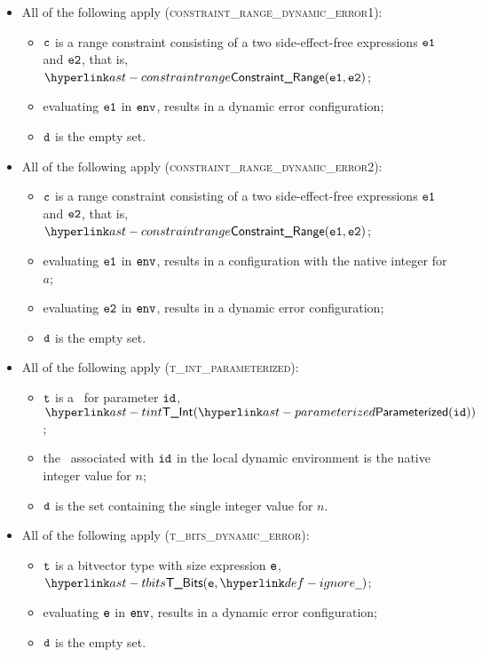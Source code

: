 \begin{itemize}
  \item All of the following apply (\textsc{constraint\_range\_dynamic\_error1}):
  \begin{itemize}
    \item $\texttt{c}$ is a range constraint consisting of a two side-effect-free expressions $\texttt{e1}$ and $\texttt{e2}$, that is, $\ConstraintRange(\veone, \vetwo)$;
    \item evaluating $\texttt{e1}$ in $\texttt{env}$, results in a dynamic error configuration;
    \item $\texttt{d}$ is the empty set.
  \end{itemize}

  \item All of the following apply (\textsc{constraint\_range\_dynamic\_error2}):
  \begin{itemize}
    \item $\texttt{c}$ is a range constraint consisting of a two side-effect-free expressions $\texttt{e1}$ and $\texttt{e2}$, that is, $\ConstraintRange(\veone, \vetwo)$;
    \item evaluating $\texttt{e1}$ in $\texttt{env}$, results in a configuration with the native integer for $a$;
    \item evaluating $\texttt{e2}$ in $\texttt{env}$, results in a dynamic error configuration;
    \item $\texttt{d}$ is the empty set.
  \end{itemize}

  \item All of the following apply (\textsc{t\_int\_parameterized}):
  \begin{itemize}
    \item $\texttt{t}$ is a \parameterizedintegertype\ for parameter $\texttt{id}$, \\ $\TInt(\parameterized(\id))$;
    \item the \nativevalue\ associated with $\texttt{id}$ in the local dynamic environment is the native integer value for $n$;
    \item $\texttt{d}$ is the set containing the single integer value for $n$.
  \end{itemize}

  \item All of the following apply (\textsc{t\_bits\_dynamic\_error}):
  \begin{itemize}
    \item $\texttt{t}$ is a bitvector type with size expression $\texttt{e}$, $\TBits(\ve, \Ignore)$;
    \item evaluating $\texttt{e}$ in $\texttt{env}$, results in a dynamic error configuration;
    \item $\texttt{d}$ is the empty set.
  \end{itemize}


\end{itemize}
